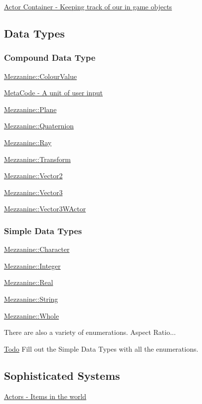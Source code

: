 \hyperlink{actorcontainer1}{Actor Container -\/ Keeping track of our in game objects}\hypertarget{index_Types}{}\subsection{Data Types}\label{index_Types}
\hypertarget{index_CompoundTypes}{}\subsubsection{Compound Data Type}\label{index_CompoundTypes}
\hyperlink{classMezzanine_1_1ColourValue}{Mezzanine::ColourValue}

\hyperlink{classMezzanine_1_1MetaCode}{MetaCode -\/ A unit of user input}

\hyperlink{classMezzanine_1_1Plane}{Mezzanine::Plane}

\hyperlink{classMezzanine_1_1Quaternion}{Mezzanine::Quaternion}

\hyperlink{classMezzanine_1_1Ray}{Mezzanine::Ray}

\hyperlink{classMezzanine_1_1Transform}{Mezzanine::Transform}

\hyperlink{classMezzanine_1_1Vector2}{Mezzanine::Vector2}

\hyperlink{classMezzanine_1_1Vector3}{Mezzanine::Vector3}

\hyperlink{classMezzanine_1_1Vector3WActor}{Mezzanine::Vector3WActor}\hypertarget{index_SimpleDataTypes}{}\subsubsection{Simple Data Types}\label{index_SimpleDataTypes}
\hyperlink{namespaceMezzanine_ad5147a419db7627ee552a2b582f1052d}{Mezzanine::Character}

\hyperlink{namespaceMezzanine_ac3576e52af3c62d13dde94829e0c5465}{Mezzanine::Integer}

\hyperlink{namespaceMezzanine_a726731b1a7df72bf3583e4a97282c6f6}{Mezzanine::Real}

\hyperlink{namespaceMezzanine_acf9fcc130e6ebf08e3d8491aebcf1c86}{Mezzanine::String}

\hyperlink{namespaceMezzanine_adcbb6ce6d1eb4379d109e51171e2e493}{Mezzanine::Whole}

\begin{DoxyParagraph}{There are also a variety of enumerations. Aspect Ratio...}

\end{DoxyParagraph}
\begin{Desc}
\item[\hyperlink{todo__todo000032}{Todo}]Fill out the Simple Data Types with all the enumerations.\end{Desc}
\hypertarget{index_Sophisticated}{}\subsection{Sophisticated Systems}\label{index_Sophisticated}
\hyperlink{classMezzanine_1_1ActorBase}{Actors -\/ Items in the world}

